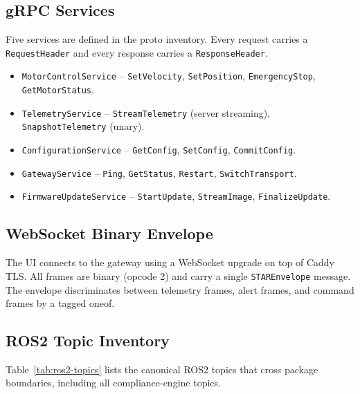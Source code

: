 \documentclass[11pt,letterpaper]{article}
\begin{document}
\subsection{gRPC Services}
Five services are defined in the proto inventory. Every request
carries a \texttt{RequestHeader} and every response carries a
\texttt{ResponseHeader}.

\begin{itemize}[leftmargin=1.4em,itemsep=2pt]
\item \texttt{MotorControlService} -- \texttt{SetVelocity},
      \texttt{SetPosition}, \texttt{EmergencyStop},
      \texttt{GetMotorStatus}.
\item \texttt{TelemetryService} -- \texttt{StreamTelemetry} (server
      streaming), \texttt{SnapshotTelemetry} (unary).
\item \texttt{ConfigurationService} -- \texttt{GetConfig},
      \texttt{SetConfig}, \texttt{CommitConfig}.
\item \texttt{GatewayService} -- \texttt{Ping}, \texttt{GetStatus},
      \texttt{Restart}, \texttt{SwitchTransport}.
\item \texttt{FirmwareUpdateService} -- \texttt{StartUpdate},
      \texttt{StreamImage}, \texttt{FinalizeUpdate}.
\end{itemize}

\subsection{WebSocket Binary Envelope}
The UI connects to the gateway using a WebSocket upgrade on top of
Caddy TLS. All frames are binary (opcode 2) and carry a single
\texttt{STAREnvelope} message. The envelope discriminates between
telemetry frames, alert frames, and command frames by a tagged oneof.

\subsection{ROS2 Topic Inventory}
Table~\ref{tab:ros2-topics} lists the canonical ROS2 topics that
cross package boundaries, including all compliance-engine topics.
\end{document}
